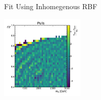 \documentclass[10pt]{beamer}
\begin{document}
\begin{frame}{Fit Using Inhomegenous RBF}
\begin{center}
    \includegraphics[width=0.3\textwidth]{figures/2dpullplots/rbf/E_2000_0p5_150_0p07.pdf} 
  \end{center}
\end{frame}
\end{document}
